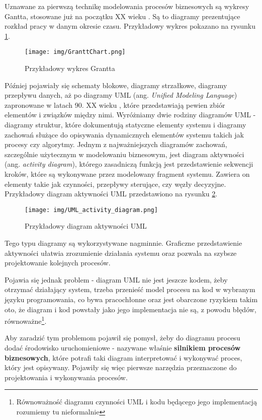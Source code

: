 \documentclass[declaration,shortabstract,mgr]{iithesis}
\begin{document}
Uznawane za pierwszą technikę modelowania procesów biznesowych są wykresy Gantta, stosowane już na początku XX wieku \cite{bpm-history-wiki}. Są to diagramy prezentujące rozkład pracy w danym okresie czasu. Przykładowy wykres pokazano na rysunku \ref{fig:grantt-chart}.

\begin{figure}[H]
    \texttt{[image: img/GranttChart.png]}
    \caption{Przykładowy wykres Grantta}
    \label{fig:grantt-chart}
\end{figure}

Później pojawiały się schematy blokowe, diagramy strzałkowe, diagramy przepływu danych, aż po diagramy UML (ang. \textit{Unified Modeling Language}) zapronowane w latach 90. XX wieku \cite{uml-wiki}, które przedstawiają pewien zbiór elementów i związków między nimi. Wyróżniamy dwie rodziny diagramów UML - diagramy struktur, które dokumentują statyczne elementy systemu i diagramy zachowań służące do opisywania dynamicznych elementów systemu takich jak procesy czy algorytmy. Jednym z najważniejszych diagramów zachowań, szczególnie użytecznym w modelowaniu biznesowym, jest diagram aktywności (ang. \textit{activity diagram}), którego zasadniczą funkcją jest przedstawienie sekwencji kroków, które są wykonywane przez modelowany fragment systemu. Zawiera on elementy takie jak czynności, przepływy sterujące, czy węzły decyzyjne. Przykładowy diagram aktywności UML przedstawiono na rysunku \ref{fig:uml-activity-diagram}.

\begin{figure}[H]
    \texttt{[image: img/UML\_activity\_diagram.png]}
    \caption{Przykładowy diagram aktywności UML}
    \label{fig:uml-activity-diagram}
\end{figure}

Tego typu diagramy są wykorzystywane nagminnie. Graficzne przedstawienie aktywności ułatwia zrozumienie działania systemu oraz pozwala na szybsze projektowanie kolejnych procesów. 

Pojawia się jednak problem - diagram UML nie jest jeszcze kodem, żeby otrzymać działający system, trzeba przenieść model procesu na kod w wybranym języku programowania, co bywa pracochłonne oraz jest obarczone ryzykiem takim oto, że diagram i kod powstały jako jego implementacja nie są, z powodu błędów, równoważne\footnote{Równoważność diagramu czynności UML i kodu będącego jego implementacją rozumiemy tu nieformalnie}.

Aby zaradzić tym problemom pojawił się pomysł, żeby do diagramu procesu dodać środowisko uruchomieniowe - nazywane właśnie {\bf silnikiem procesów biznesowych}, które potrafi taki diagram interpretować i wykonywać proces, który jest opisywany. Pojawiły się więc pierwsze narzędzia przeznaczone do projektowania i wykonywania procesów.
\end{document}
